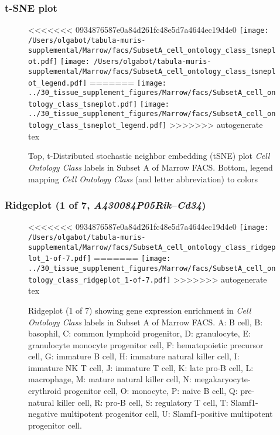 \clearpage
\subsubsection{t-SNE plot}
\begin{figure}[h]
\centering
<<<<<<< 0934876587e0a84d261fc48e5d7a4644ec19d4e0
\texttt{[image: /Users/olgabot/tabula-muris-supplemental/Marrow/facs/SubsetA\_cell\_ontology\_class\_tsneplot.pdf]}
\texttt{[image: /Users/olgabot/tabula-muris-supplemental/Marrow/facs/SubsetA\_cell\_ontology\_class\_tsneplot\_legend.pdf]}
=======
\texttt{[image: ../30\_tissue\_supplement\_figures/Marrow/facs/SubsetA\_cell\_ontology\_class\_tsneplot.pdf]}
\texttt{[image: ../30\_tissue\_supplement\_figures/Marrow/facs/SubsetA\_cell\_ontology\_class\_tsneplot\_legend.pdf]}
>>>>>>> autogenerate tex
\caption{Top, t-Distributed stochastic neighbor embedding (tSNE) plot  \emph{Cell Ontology Class} labels in Subset A of Marrow FACS. Bottom, legend mapping \emph{Cell Ontology Class} (and letter abbreviation) to colors}
\end{figure}


\clearpage

\subsubsection{Ridgeplot (1 of 7, \emph{A430084P05Rik}--\emph{Cd34})}
\begin{figure}[h]
\centering
<<<<<<< 0934876587e0a84d261fc48e5d7a4644ec19d4e0
\texttt{[image: /Users/olgabot/tabula-muris-supplemental/Marrow/facs/SubsetA\_cell\_ontology\_class\_ridgeplot\_1-of-7.pdf]}
=======
\texttt{[image: ../30\_tissue\_supplement\_figures/Marrow/facs/SubsetA\_cell\_ontology\_class\_ridgeplot\_1-of-7.pdf]}
>>>>>>> autogenerate tex

\caption{ Ridgeplot (1 of 7)  showing gene expression enrichment in \emph{Cell Ontology Class} labels in Subset A of Marrow FACS. A: B cell, B: basophil, C: common lymphoid progenitor, D: granulocyte, E: granulocyte monocyte progenitor cell, F: hematopoietic precursor cell, G: immature B cell, H: immature natural killer cell, I: immature NK T cell, J: immature T cell, K: late pro-B cell, L: macrophage, M: mature natural killer cell, N: megakaryocyte-erythroid progenitor cell, O: monocyte, P: naive B cell, Q: pre-natural killer cell, R: pro-B cell, S: regulatory T cell, T: Slamf1-negative multipotent progenitor cell, U: Slamf1-positive multipotent progenitor cell.}
\end{figure}


